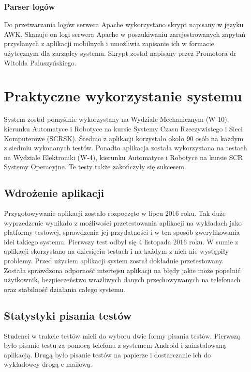 \documentclass[eng]{mgr}
\begin{document}
			\subsection{Parser logów}
			Do przetwarzania logów serwera Apache wykorzystano skrypt napisany w języku AWK. Skanuje on logi serwera Apache w poszukiwaniu zarejestrowanych zapytań przysłanych z aplikacji mobilnych i umożliwia zapisanie ich w formacie użytecznym dla zarządcy systemu. Skrypt został napisany przez Promotora dr Witolda Paluszyńskiego.
			

	\chapter{Praktyczne wykorzystanie systemu}
	
	System został pomyślnie wykorzystany na Wydziale Mechanicznym (W-10), kierunku Automatyce i Robotyce na kursie Systemy Czasu Rzeczywistego i Sieci Komputerowe (SCRSK). Średnio z aplikacji korzystało około 90 osób na każdym z siedmiu wykonanych testów. Ponadto aplikacja została wykorzystana na testach na Wydziale Elektroniki (W-4), kierunku Automatyce i Robotyce na kursie SCR Systemy Operacyjne. Te testy także zakończyły się sukcesem.
	
		\section{Wdrożenie aplikacji}
		
		Przygotowywanie aplikacji zostało rozpoczęte w lipcu 2016 roku. Tak duże wyprzedzenie wynikało z możliwości przetestowania aplikacji na wykładach jako platformy testowej, sprawdzenia jej przydatności i w ten sposób zweryfikowania idei takiego systemu. Pierwszy test odbył się 4 listopada 2016 roku. W sumie z aplikacji skorzystano na dziesięciu testach i na każdym z nich nie wystąpiły problemy. Przed użyciem aplikacji system został dokładnie przetestowany. Została sprawdzona odporność interfejsu aplikacji na błędy jakie może popełnić użytkownik, bezpieczeństwo wrażliwych danych przechowywanych na telefonach oraz stabilność działania całego systemu.

		\section{Statystyki pisania testów}
			
		Studenci w trakcie testów mieli do wyboru dwie formy pisania testów. Pierwszą było pisanie testu za pomocą telefonu z systemem Android i zainstalowaną aplikacją. Drugą było pisanie testów na papierze i dostarczanie ich do wykładowcy drogą e-mailową.\\
		
\end{document}
